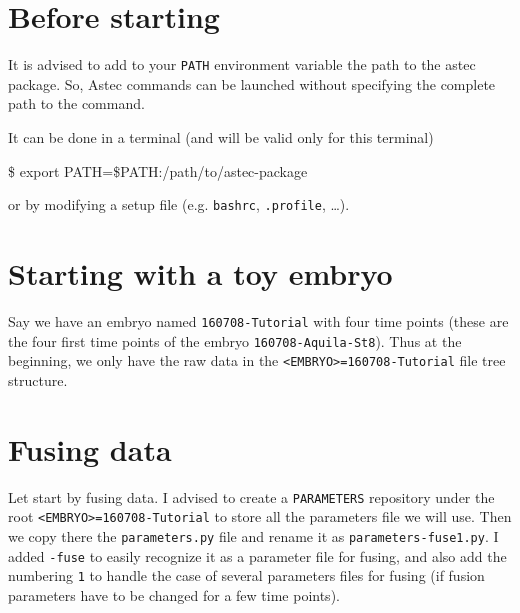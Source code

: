 
\section*{Before starting}

It is advised to add to your \texttt{PATH} environment variable the path to the astec package. So, Astec commands can be launched without specifying the complete path to the command.

It can be done in a terminal (and will be valid only for this terminal)
\begin{code}{0.8}
\$ export PATH=\${PATH}:/path/to/astec-package
\end{code}
or by modifying a setup file (e.g. \texttt{bashrc}, \texttt{.profile}, \ldots).










\section{Starting with a toy embryo}

Say we have an embryo named \texttt{160708-Tutorial} with four time points (these are the four first time points of the embryo \texttt{160708-Aquila-St8}). Thus at the beginning, we only have the raw data in the \texttt{<EMBRYO>=160708-Tutorial} file tree structure.










\section{Fusing data}

Let start by fusing data. I advised to create a \texttt{PARAMETERS} repository under the root \texttt{<EMBRYO>=160708-Tutorial} to store all the parameters file we will use. Then we copy there the \texttt{parameters.py} file and rename it as \texttt{parameters-fuse1.py}. I added \texttt{-fuse} to easily recognize it as a parameter file for fusing, and also add the numbering \texttt{1} to handle the case of several parameters files for fusing (if fusion parameters have to be changed for a few time points).


